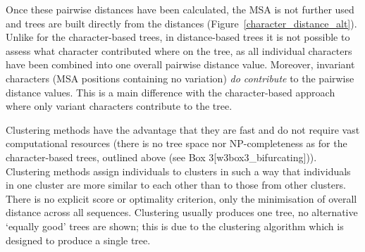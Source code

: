 Once these pairwise distances have been calculated, the MSA is not further used and trees are built directly from the distances (Figure~\ref{character_distance_alt}).
Unlike for the character-based trees, in distance-based trees it is not possible to assess what character contributed where on the tree, as all individual characters have been combined into one overall pairwise distance value.
Moreover, invariant characters (MSA positions containing no variation) \textit{do contribute} to the pairwise distance values.
This is a main difference with the character-based approach where only variant characters contribute to the tree.

Clustering methods have the advantage that they are fast and do not require vast computational resources (there is no tree space nor NP-completeness as for the character-based trees, outlined above (see Box 3[w3box3\_bifurcating])).
Clustering methods assign individuals to clusters in such a way that individuals in one cluster are more similar to each other than to those from other clusters.
There is no explicit score or optimality criterion, only the minimisation of overall distance across all sequences.
Clustering usually produces one tree, no alternative `equally good' trees are shown; this is due to the clustering algorithm which is designed to produce a single tree.


